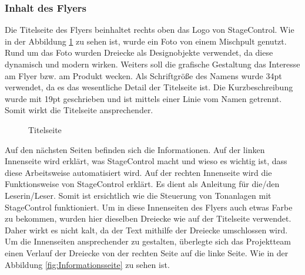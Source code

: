 \newpage
\subsubsection{Inhalt des Flyers}
Die Titelseite des Flyers beinhaltet rechts oben das Logo von StageControl. Wie in der Abbildung \ref{fig:Titelseite} zu sehen ist, wurde ein Foto von einem Mischpult genutzt. Rund um das Foto wurden Dreiecke als Designobjekte verwendet, da diese dynamisch und modern wirken. Weiters soll die grafische Gestaltung das Interesse am Flyer bzw. am Produkt wecken. 
Als Schriftgröße des Namens wurde 34pt verwendet, da es das wesentliche Detail der Titelseite ist. Die Kurzbeschreibung wurde mit 19pt geschrieben und ist mittels einer Linie vom Namen getrennt. Somit wirkt die Titelseite ansprechender.

\begin{figure}[H]
	\centering
	\caption[Titelseite]{Titelseite}
	\label{fig:Titelseite}
\end{figure}

\newpage
Auf den nächsten Seiten befinden sich die Informationen. Auf der linken Innenseite wird erklärt, was StageControl macht und wieso es wichtig ist, dass diese Arbeitsweise automatisiert wird. Auf der rechten Innenseite wird die Funktionsweise von StageControl erklärt. Es dient als Anleitung für die/den Leserin/Leser. Somit ist ersichtlich wie die Steuerung von Tonanlagen mit StageControl funktioniert. Um in diese Innenseiten des Flyers auch etwas Farbe zu bekommen, wurden hier dieselben Dreiecke wie auf der Titelseite verwendet. Daher wirkt es nicht kalt, da der Text mithilfe der Dreiecke umschlossen wird. Um die Innenseiten ansprechender zu gestalten, überlegte sich das Projektteam einen Verlauf der Dreiecke von der rechten Seite auf die linke Seite. Wie in der Abbildung \ref{fig:Informationsseite} zu sehen ist.

